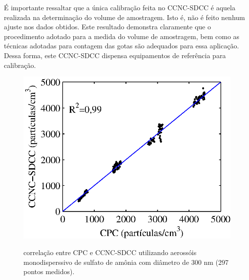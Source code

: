 \'{E} importante ressaltar que a \'{u}nica calibra\c{c}\~{a}o feita no CCNC-SDCC \'{e} aquela realizada na determina\c{c}\~{a}o do volume de amostragem. Isto \'{e}, n\~{a}o \'{e} feito nenhum ajuste nos dados obtidos. Este resultado demonstra claramente que o procedimento adotado para a medida do volume de amostragem, bem como as t\'{e}cnicas adotadas para contagem das gotas s\~{a}o adequados para essa aplica\c{c}\~{a}o. Dessa forma, este CCNC-SDCC dispensa equipamentos de refer\^{e}ncia para calibra\c{c}\~{a}o.

\begin{figure}[hbt]
\begin{center}
\includegraphics[scale=0.9]{GraficosMatlab/corr_300nm.eps}\\
\end{center}
\caption{\label{corr300}\hspace{-0.1em} correla\c{c}\~{a}o entre CPC e CCNC-SDCC utilizando aeross\'{o}is monodisperssivo de sulfato de am\^{o}nia com di\^{a}metro de 300 nm (297 pontos medidos). }
\end{figure}

